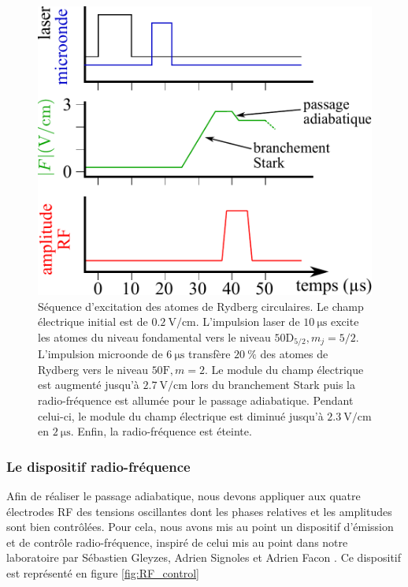 \begin{figure}[!h]
\centering
\includegraphics[width=.7\linewidth]{figures/circulars/seq_circul}
\caption[Séquence d'excitation des atomes de Rydberg circulaires]{
Séquence d'excitation des atomes de Rydberg circulaires.
Le champ électrique initial est de $\SI{0.2}{\V/\cm}$.
L'impulsion laser de $\SI{10}{\us}$ excite les atomes du niveau fondamental vers le niveau $\mathrm{50D}_{5/2},m_j=5/2$.
L'impulsion microonde de $\SI{6}{\us}$ transfère $\SI{20}{\percent}$ des atomes de Rydberg vers le niveau $\mathrm{50F},m=2$.
Le module du champ électrique est augmenté jusqu'à $\SI{2.7}{\V/\cm}$ lors du \og branchement Stark \fg{} puis la radio-fréquence est allumée pour le passage adiabatique.
Pendant celui-ci, le module du champ électrique est diminué jusqu'à $\SI{2.3}{\V/\cm}$ en $\SI{2}{\us}$.
Enfin, la radio-fréquence est éteinte.
}
\label{fig:seq_circul}
\end{figure}

\subsubsection*{Le dispositif radio-fréquence}
\noindent Afin de réaliser le passage adiabatique, nous devons appliquer aux quatre électrodes RF des tensions oscillantes dont les phases relatives et les amplitudes sont bien contrôlées.
Pour cela, nous avons mis au point un dispositif d'émission et de contrôle radio-fréquence, inspiré de celui mis au point dans notre laboratoire par Sébastien Gleyzes, Adrien Signoles et Adrien Facon \cite{PHD_SIGNOLES,PHD_FACON}.
Ce dispositif est représenté en figure \eqref{fig:RF_control}

